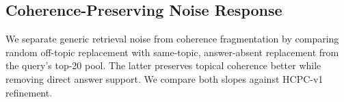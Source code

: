 
\subsection{Coherence-Preserving Noise Response}
\label{sec:fix05_noise_slope}

We separate generic retrieval noise from coherence fragmentation by
comparing random off-topic replacement with same-topic, answer-absent
replacement from the query's top-20 pool. The latter preserves topical
coherence better while removing direct answer support. We compare both
slopes against HCPC-v1 refinement.

